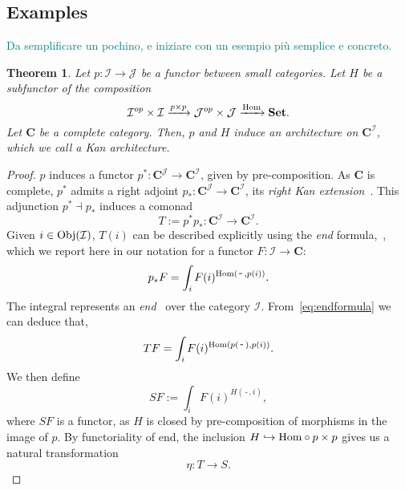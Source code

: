 \documentclass[12pt]{article}
\newtheorem{theorem}{Theorem}
\newcommand{\pietro}[1]{\textcolor{teal}{#1}}
\newcommand{\Hom}{{\textnormal{Hom}}}
\newcommand{\Obj}{{\textnormal{Obj}}}
\newcommand{\Set}{{\mathbf{Set}}}
\newcommand{\Cat}{{\mathbf{C}}}
\newcommand{\ICat}{{\mathcal{I}}}
\newcommand{\JCat}{{\mathcal{J}}}
\newcommand{\anon}{{\,\mbox{-}\,}}
\begin{document}
\subsection{Examples}

\pietro{Da semplificare un pochino, e iniziare con un esempio più semplice e concreto.}

\begin{theorem}\label{thm:kan_architecture}
    Let $p\colon \ICat \rightarrow \JCat$ be a functor between small categories. Let $H$ be a subfunctor of the composition
    \begin{equation*}
        \ICat^{op} \times \ICat \xrightarrow{p \times p}
        \JCat^{op} \times \JCat \xrightarrow{\Hom} \Set.
    \end{equation*}
    Let $\Cat$ be a complete category. Then, $p$ and $H$ induce an architecture on $\Cat^\ICat$, which we call a {\em Kan architecture}.
\end{theorem}

\begin{proof}
    $p$ induces a functor $p^* \colon \Cat^\JCat \rightarrow \Cat^\ICat$, given by pre-composition. As $\Cat$ is complete, $p^*$ admits a right adjoint $p_* \colon \Cat^\JCat \rightarrow \Cat^\ICat$, its {\em right Kan extension}~\cite[Chapt.~X]{mac2013categories}. This adjunction $p^* \dashv p_*$ induces a comonad
    \begin{equation*}
        T := p^*p_* \colon \Cat^\ICat \rightarrow \Cat^\ICat.
    \end{equation*}
    Given $i \in \Obj(\ICat)$, $T(i)$ can be described explicitly using the {\em end} formula,~\cite[Eq.~X.4.3]{mac2013categories}, which we report here in our notation for a functor $F \colon \ICat \rightarrow \Cat$:
    \begin{equation}\label{eq:endformula}
        p_* F = \int_i F(i)^{\Hom(\anon, p(i))}.
    \end{equation}
    The integral represents an {\em end}~\cite[Sect.~IX.5]{mac2013categories} over the category $\ICat$. From~\cref{eq:endformula} we can deduce that,
    \begin{equation}\label{eq:comonad_endformula}
        T F = \int_i F(i)^{\Hom(p(\anon), p(i))}.
    \end{equation}
    We then define
    \begin{equation}\label{eq:functor_endformula}
        S F := \int_i F(i)^{H(\anon, i)},
    \end{equation}
    where $S F$ is a functor, as $H$ is closed by pre-composition of morphisms in the image of $p$. By functoriality of end, the inclusion $H \hookrightarrow \Hom \circ p \times p$ gives us a natural transformation
    \begin{equation*}
        \eta \colon T \rightarrow S.
    \end{equation*}
\end{proof}
\end{document}

